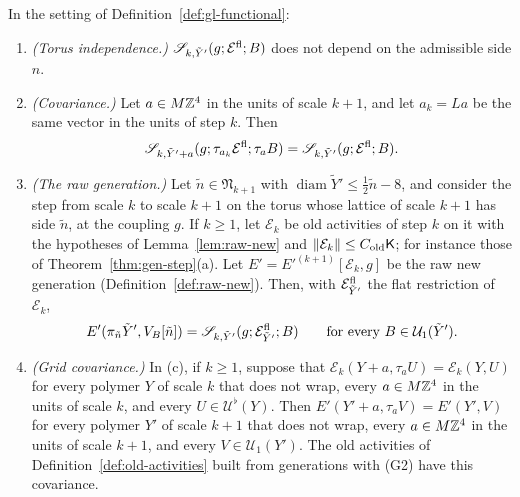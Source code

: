 \begin{proposition}\label{prop:gl-functional}
In the setting of Definition~\ref{def:gl-functional}:
\begin{enumerate}[label=(\alph*)]
\item \emph{(Torus independence.)} $\mathscr S_{k,\tilde Y'}(g;\mathcal E^{\rm fl};B)$ does not depend on the admissible side $n$.
\item \emph{(Covariance.)} Let $a\in M\mathbb Z^4$ in the units of scale $k+1$, and let $a_k=La$ be the same vector in the units of step $k$. Then
\[
\mathscr S_{k,\tilde Y'+a}(g;\tau_{a_k}\mathcal E^{\rm fl};\tau_aB)=\mathscr S_{k,\tilde Y'}(g;\mathcal E^{\rm fl};B).
\]
\item \emph{(The raw generation.)} Let $\tilde n\in\mathfrak N_{k+1}$ with $\operatorname{diam}\tilde Y'\le\frac12\tilde n-8$, and consider the step from scale $k$ to scale $k+1$ on the torus whose lattice of scale $k+1$ has side $\tilde n$, at the coupling $g$. If $k\ge1$, let $\mathcal E_k$ be old activities of step $k$ on it with the hypotheses of Lemma~\ref{lem:raw-new} and $\|\mathcal E_k\|\le C_{\rm old}\mathsf K$; for instance those of Theorem~\ref{thm:gen-step}(a). Let $E'=E'^{(k+1)}[\mathcal E_k,g]$ be the raw new generation (Definition~\ref{def:raw-new}). Then, with $\mathcal E^{\rm fl}_{\tilde Y'}$ the flat restriction of $\mathcal E_k$,
\[
E'(\pi_{\tilde n}\tilde Y',V_B[\tilde n])=\mathscr S_{k,\tilde Y'}(g;\mathcal E^{\rm fl}_{\tilde Y'};B)\qquad\text{for every }B\in\mathcal U_1(\tilde Y').
\]
\item \emph{(Grid covariance.)} In (c), if $k\ge1$, suppose that $\mathcal E_k(Y+a,\tau_aU)=\mathcal E_k(Y,U)$ for every polymer $Y$ of scale $k$ that does not wrap, every $a\in M\mathbb Z^4$ in the units of scale $k$, and every $U\in\mathcal U^\flat(Y)$. Then $E'(Y'+a,\tau_aV)=E'(Y',V)$ for every polymer $Y'$ of scale $k+1$ that does not wrap, every $a\in M\mathbb Z^4$ in the units of scale $k+1$, and every $V\in\mathcal U_1(Y')$. The old activities of Definition~\ref{def:old-activities} built from generations with (G2) have this covariance.
\end{enumerate}
\end{proposition}


